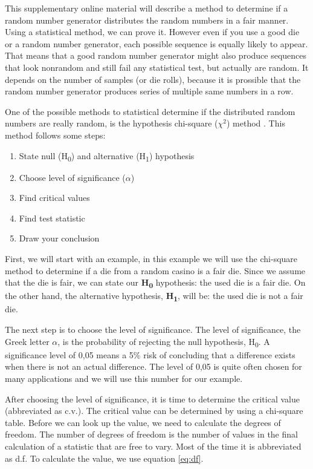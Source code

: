 This supplementary online material will describe a method to determine if a random number generator distributes the random numbers in a fair manner. Using a statistical method, we can prove it. However even if you use a good die or a random number generator, each possible sequence is equally likely to appear. That means that a good random number generator might also produce sequences that look nonrandom and still fail any statistical test, but actually are random. It depends on the number of samples (or die rolls), because it is prossible that the random number generator produces series of multiple same numbers in a row.

One of the possible methods to statistical determine if the distributed random numbers are really random, is the hypothesis chi-square (${\chi}^2$) method \cite{chisquareRandom} \cite{chisquare}. This method follows some steps:

\begin{enumerate}
	\itemsep0em
	\item State null (H\textsubscript{0}) and alternative (H\textsubscript{1}) hypothesis
	\item Choose level of significance ($\alpha$)
	\item Find critical values 
	\item Find test statistic
	\item Draw your conclusion
\end{enumerate}

First, we will start with an example, in this example we will use the chi-square method to determine if a die from a random casino is a fair die. Since we assume that the die is fair, we can state our \textbf{H\textsubscript{0}} hypothesis: the used die is a fair die. On the other hand, the alternative hypothesis, \textbf{H\textsubscript{1}}, will be: the used die is not a fair die.

The next step is to choose the level of significance. The level of significance, the Greek letter $\alpha$, is the probability of rejecting the null hypothesis, H\textsubscript{0}. A significance level of 0,05 means a 5\% risk of concluding that a difference exists when there is not an actual difference. The level of 0,05 is quite often chosen for many applications and we will use this number for our example.

After choosing the level of significance, it is time to determine the critical value (abbreviated as c.v.). The critical value can be determined by using a chi-square table. Before we can look up the value, we need to calculate the degrees of freedom. The number of degrees of freedom is the number of values in the final calculation of a statistic that are free to vary. Most of the time it is abbreviated as d.f. To calculate the value, we use equation \ref{eq:df}.

